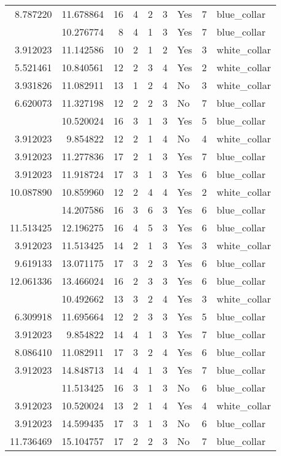 \documentclass[
]{article}
\begin{document}
\begin{longtable}[t]{rrrrrllrl}
8.787220 & 11.678864 & 16 & 4 & 2 & 3 & Yes & 7 & blue\_collar\\
\addlinespace
3.912023 & 10.276774 & 8 & 4 & 1 & 3 & Yes & 7 & blue\_collar\\
3.912023 & 11.142586 & 10 & 2 & 1 & 2 & Yes & 3 & white\_collar\\
5.521461 & 10.840561 & 12 & 2 & 3 & 4 & Yes & 2 & white\_collar\\
3.931826 & 11.082911 & 13 & 1 & 2 & 4 & No & 3 & white\_collar\\
6.620073 & 11.327198 & 12 & 2 & 2 & 3 & No & 7 & blue\_collar\\
\addlinespace
3.912023 & 10.520024 & 16 & 3 & 1 & 3 & Yes & 5 & blue\_collar\\
3.912023 & 9.854822 & 12 & 2 & 1 & 4 & No & 4 & white\_collar\\
3.912023 & 11.277836 & 17 & 2 & 1 & 3 & Yes & 7 & blue\_collar\\
3.912023 & 11.918724 & 17 & 3 & 1 & 3 & Yes & 6 & blue\_collar\\
10.087890 & 10.859960 & 12 & 2 & 4 & 4 & Yes & 2 & white\_collar\\
\addlinespace
10.128629 & 14.207586 & 16 & 3 & 6 & 3 & Yes & 6 & blue\_collar\\
11.513425 & 12.196275 & 16 & 4 & 5 & 3 & Yes & 6 & blue\_collar\\
3.912023 & 11.513425 & 14 & 2 & 1 & 3 & Yes & 3 & white\_collar\\
9.619133 & 13.071175 & 17 & 3 & 2 & 3 & Yes & 6 & blue\_collar\\
12.061336 & 13.466024 & 16 & 2 & 3 & 3 & Yes & 6 & blue\_collar\\
\addlinespace
4.248495 & 10.492662 & 13 & 3 & 2 & 4 & Yes & 3 & white\_collar\\
6.309918 & 11.695664 & 12 & 2 & 3 & 3 & Yes & 5 & blue\_collar\\
3.912023 & 9.854822 & 14 & 4 & 1 & 3 & Yes & 7 & blue\_collar\\
8.086410 & 11.082911 & 17 & 3 & 2 & 4 & Yes & 6 & blue\_collar\\
3.912023 & 14.848713 & 14 & 4 & 1 & 3 & Yes & 7 & blue\_collar\\
\addlinespace
3.912023 & 11.513425 & 16 & 3 & 1 & 3 & No & 6 & blue\_collar\\
3.912023 & 10.520024 & 13 & 2 & 1 & 4 & Yes & 4 & white\_collar\\
3.912023 & 14.599435 & 17 & 3 & 1 & 3 & No & 6 & blue\_collar\\
11.736469 & 15.104757 & 17 & 2 & 2 & 3 & No & 7 & blue\_collar\\

\end{longtable}
\end{document}
